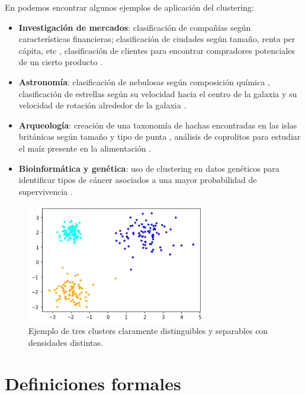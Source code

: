 En \cite{everitt2011cluster} podemos encontrar algunos ejemplos de aplicación del clustering:
\begin{itemize}
	\item \textbf{Investigación de mercados}: clasificación de compañías según características financieras; clasificación de ciudades según tamaño, renta per cápita, etc \cite{green1967cluster}, clasificación de clientes para encontrar compradores potenciales de un cierto producto \cite{chakrapani2004statistics}.
	\item \textbf{Astronomía}: clasificación de nebulosas según composición química \cite{faundez1996classification}, clasificación de estrellas según su velocidad hacia el centro de la galaxia y su velocidad de rotación alrededor de la galaxia \cite{celeux1992classification}.
	\item \textbf{Arqueología}: creación de una taxonomía de hachas encontradas en las islas británicas según tamaño y tipo de punta \cite{hodson1971numerical}, análisis de coprolitos para estudiar el maíz presente en la alimentación \cite{sutton1995cluster}.
	\item \textbf{Bioinformática y genética}: uso de clustering en datos genéticos para identificar tipos de cáncer asociados a una mayor probabilidad de supervivencia \cite{eisen1998cluster}.
\end{itemize}


\begin{figure}
	\centering
	\includegraphics[width=0.7\textwidth]{Images/clusters}
	\caption{Ejemplo de tres clusters claramente distinguibles y separables con densidades distintas.}
	\label{fig:clusters}
\end{figure}



\section{Definiciones formales}

